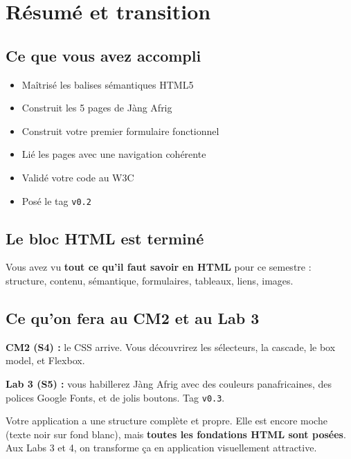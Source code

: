 \documentclass[11pt,a4paper]{article}
\newcommand{\cmark}{\ding{51}}
\begin{document}
\section{Résumé et transition}

\subsection{Ce que vous avez accompli}

\begin{itemize}[leftmargin=*,nosep]
    \item Maîtrisé les balises sémantiques HTML5 \cmark
    \item Construit les 5 pages de Jàng Afrig \cmark
    \item Construit votre premier formulaire fonctionnel \cmark
    \item Lié les pages avec une navigation cohérente \cmark
    \item Validé votre code au W3C \cmark
    \item Posé le tag \texttt{v0.2} \cmark
\end{itemize}

\subsection{Le bloc HTML est terminé}

Vous avez vu \textbf{tout ce qu'il faut savoir en HTML} pour ce semestre :
structure, contenu, sémantique, formulaires, tableaux, liens, images.

\subsection{Ce qu'on fera au CM2 et au Lab 3}

\textbf{CM2 (S4) :} le CSS arrive. Vous découvrirez les sélecteurs, la
cascade, le box model, et Flexbox.

\textbf{Lab 3 (S5) :} vous habillerez Jàng Afrig avec des couleurs
panafricaines, des polices Google Fonts, et de jolis boutons. Tag \texttt{v0.3}.

\begin{projetbox}
Votre application a une structure complète et propre. Elle est encore
moche (texte noir sur fond blanc), mais \textbf{toutes les fondations
HTML sont posées}. Aux Labs 3 et 4, on transforme ça en application
visuellement attractive.
\end{projetbox}
\end{document}
